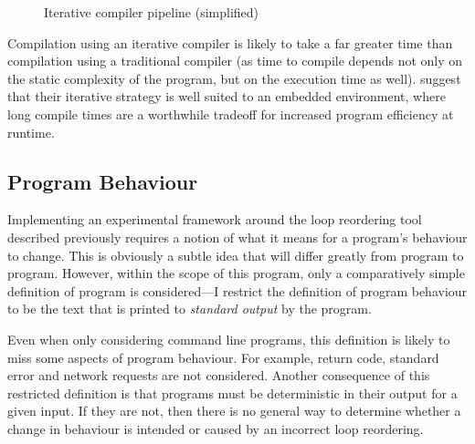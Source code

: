\documentclass[journal]{IEEEtran}
\begin{document}
\begin{figure}[h] 
  \centering 
  \caption{Iterative compiler pipeline (simplified)} 
  \label{fig:pipeline-dynamic}
\end{figure}

Compilation using an iterative compiler is likely to take a far greater time
than compilation using a traditional compiler (as time to compile depends not
only on the static complexity of the program, but on the execution time as
well). \textcite{fursin_evaluating_2002} suggest that their iterative strategy
is well suited to an embedded environment, where long compile times are a
worthwhile tradeoff for increased program efficiency at runtime.

\subsection{Program Behaviour} \label{ssec:behaviour}

Implementing an experimental framework around the loop reordering tool described
previously requires a notion of what it means for a program's behaviour to
change. This is obviously a subtle idea that will differ greatly from program to
program. However, within the scope of this program, only a comparatively simple
definition of program is considered---I restrict the definition of program
behaviour to be the text that is printed to \emph{standard output} by the
program.

Even when only considering command line programs, this definition is likely to
miss some aspects of program behaviour. For example, return code, standard error
and network requests are not considered. Another consequence of this restricted
definition is that programs must be deterministic in their output for a given
input. If they are not, then there is no general way to determine whether a
change in behaviour is intended or caused by an incorrect loop reordering.
\end{document}
